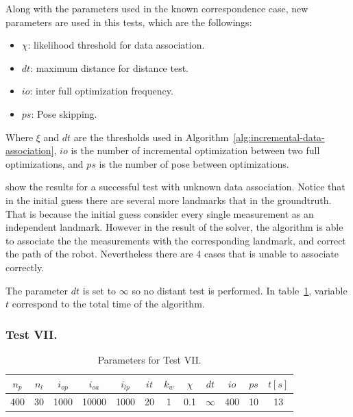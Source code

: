 Along with the parameters used in the known correspondence case, new parameters are used in this tests, which are the followings:

\begin{itemize}
\item $\chi$: likelihood threshold for data association.
\item $dt$: maximum distance for distance test.
\item $io$: inter full optimization frequency.
\item $ps$: Pose skipping.
\end{itemize}

Where $\xi$ and $dt$ are the thresholds used in Algorithm~\ref{alg:incremental-data-association}, $io$ is the number of incremental optimization between two full optimizations, and $ps$ is the number of pose between optimizations. 

 show the results for a successful test with unknown data association. Notice that in the initial guess there are several more landmarks that in the groundtruth. That is because the initial guess consider every single measurement as an independent landmark. However in the result of the solver, the algorithm is able to associate the the measurements with the corresponding landmark, and correct the path of the robot. Nevertheless there are 4 cases that is unable to associate correctly.

The parameter $dt$ is set to $\infty$ so no distant test is performed. In table~\ref{tab:test-vii}, variable $t$ correspond to the total time of the algorithm. 

\subsubsection{Test VII.}
\label{sec:test-vii}

\begin{table}[htbp!]
    \centering
    \begin{tabular}{|c|c|c|c|c|c|c|c|c|c|c|c|}
        \hline
        $n_p$ & $n_l$ & $i_{op}$ & $i_{oa}$ & $i_{lp}$ & $it$ & $k_w$ & $\chi$ & $dt$ & $io$ & $ps$ & $t [s]$\\
        \hline \hline
        400 & 30 & 1000 & 10000 & 1000 & 20 & 1 & 0.1 & $\infty$ & 400 & 10 & 13\\
        \hline 
    \end{tabular}
    \caption{Parameters for Test VII.}
    \label{tab:test-vii}
\end{table}

